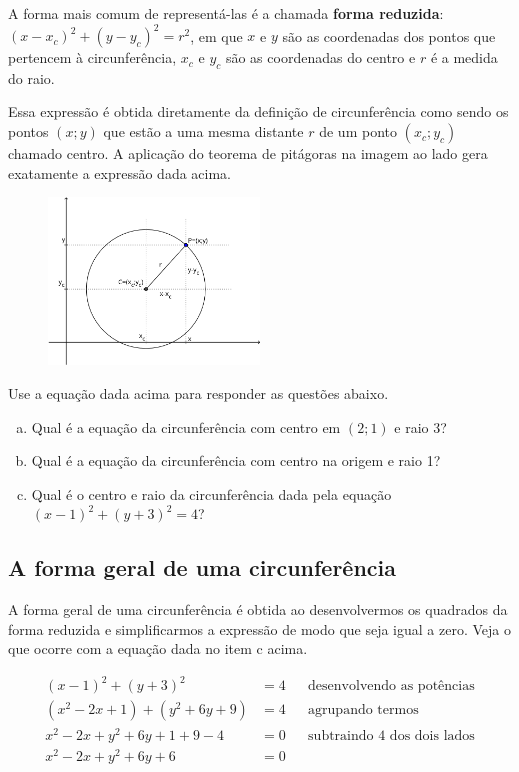 \documentclass[main_estudante.tex]{subfiles}
\begin{document}
A forma mais comum de representá-las é a chamada \textbf{forma reduzida}: $(x-x_c)^2+(y-y_c)^2=r^2$, em que $x$ e $y$ são as coordenadas dos pontos que pertencem à circunferência, $x_c$ e $y_c$ são as coordenadas do centro e $r$ é a medida do raio.

Essa expressão é obtida diretamente da definição de circunferência como sendo os pontos $(x;y)$ que estão a uma mesma distante $r$ de um ponto $(x_c;y_c)$ chamado centro. A aplicação do teorema de pitágoras na imagem ao lado gera exatamente a expressão dada acima.

\begin{figure}[h]
\centering
\includegraphics[width=0.5\textwidth]{./img/c6q12.png}
\end{figure}

\begin{questao}
Use a equação dada acima para responder as questões abaixo.
\begin{enumerate}[a)]
\item Qual é a equação da circunferência com centro em $(2;1)$ e raio 3? 
\item Qual é a equação da circunferência com centro na origem e raio 1?
\item Qual é o centro e raio da circunferência dada pela equação $(x-1)^2+(y+3)^2=4$?
\end{enumerate} 
\end{questao}

\subsection*{A forma geral de uma circunferência}

A forma geral de uma circunferência é obtida ao desenvolvermos os quadrados da forma reduzida e simplificarmos a expressão de modo que seja igual a zero. Veja o que ocorre com a equação dada no item c acima.

\begin{align*}
 (x-1)^2+(y+3)^2 &=4 && \text{desenvolvendo as potências}\\
 (x^2-2x+1)+(y^2+6y+9)&=4 && \text{agrupando termos}\\
 x^2-2x+y^2+6y+1+9-4 &=0 && \text{subtraindo 4 dos dois lados}\\
 x^2-2x+y^2+6y+6&=0
 \end{align*}
\end{document}

